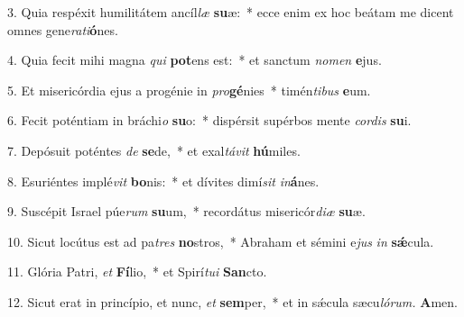 \item 3. Quia respéxit humilitátem ancíl\textit{læ} \textbf{su}æ:~* ecce enim ex hoc beátam me dicent omnes gene\textit{rati}\textbf{ó}nes.
\item 4. Quia fecit mihi magna \textit{qui} \textbf{pot}ens est:~* et san\-ctum \textit{nomen} \textbf{e}jus.
\item 5. Et misericórdia ejus a progénie in \textit{pro}\textbf{gé}nies~* timén\textit{tibus} \textbf{e}um.
\item 6. Fecit poténtiam in bráchi\textit{o} \textbf{su}o:~* dispérsit supérbos mente \textit{cordis} \textbf{su}i.
\item 7. Depósuit poténtes \textit{de} \textbf{se}de,~* et exal\textit{távit} \textbf{hú}miles.
\item 8. Esuriéntes implé\textit{vit} \textbf{bo}nis:~* et dívites dimí\textit{sit} \textit{in}\textbf{á}nes.
\item 9. Suscépit Israel púe\textit{rum} \textbf{su}um,~* recordátus misericór\textit{diæ} \textbf{su}æ.
\item 10. Sicut locútus est ad pa\textit{tres} \textbf{no}stros,~* Abraham et sémini e\textit{jus} \textit{in} \textbf{sǽ}cula.
\item 11. Glória Patri, \textit{et} \textbf{Fí}lio,~* et Spirí\hspace{0.03em}\textit{tui} \textbf{San}cto.
\item 12. Sicut erat in princípio, et nunc, \textit{et} \textbf{sem}per,~* et in sǽcula sæcu\hspace{0.03em}\textit{lórum.} \textbf{A}men.
